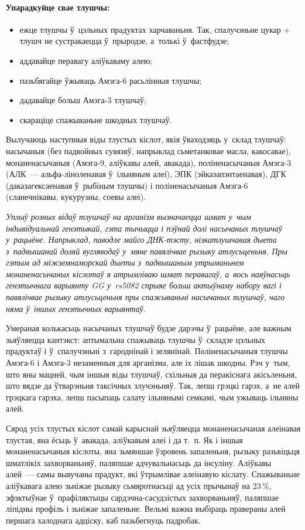 \paragraph{Упарадкуйце свае тлушчы:}
\begin{itemize}
  \item ежце тлушчы ў~цэльных прадуктах харчаваньня. Так, спалучэньне цукар + тлушч не сустракаецца ў~прыродзе, а~толькі ў~фастфудзе;
  \item аддавайце перавагу аліўкаваму алею;
  \item пазьбягайце ўжываць Амэга-6 расьлінныя тлушчы;
  \item дадавайце больш Амэга-3 тлушчаў;
  \item скараціце спажываньне шкодных тлушчаў.
\end{itemize}

Вылучаюць наступныя віды тлустых кіслот, якія ўваходзяць у~склад тлушчаў: насычаныя (без падвойных сувязяў, напрыклад сьметанковае масла, какосавае), монаненасычаныя (Амэга-9, аліўкавы алей, авакада), поліненасычаныя Амэга-3 (АЛК~--- альфа-ліноленавая ў~ільняным алеі), ЭПК (эйказапэнтаенавая), ДГК (даказагексаенавая ў~рыбіным тлушчы) і поліненасычаныя Амэга-6 (сланечнікавы, кукурузны, соевы алеі).

\emph{Уплыў розных відаў тлушчаў на арганізм вызначаецца шмат у~чым індывідуальнай генэтыкай, гэта тычыцца і пэўнай долі насычаных тлушчаў у~рацыёне. Напрыклад, паводле майго ДНК-тэсту, нізкатлушчавая дыета з~падвышанай доляй вугляводаў у~мяне павялічвае рызыку атлусьценьня. Пры гэтым ад міжземнаморскай дыеты з~падвышаным утрыманьнем монаненасычаных кіслотаў я атрымліваю шмат перавагаў, а~вось наяўнасьць генэтычнага варыянту GG у~rs5082 спрыяе больш актыўнаму набору вагі і павялічвае рызыку атлусьценьня пры спажываньні насычаных тлушчаў, чаго няма ў~іншых генэтычных варыянтаў.}

Умераная колькасьць насычаных тлушчаў будзе дарэчы ў~рацыёне, але важным зьяўляецца кантэкст: аптымальна спажываць тлушчы ў~складзе цэльных прадуктаў і ў~спалучэньні з~гароднінай і зелянінай. Поліненасычаныя тлушчы Амэга-6 і Амэга-3 незаменныя для арганізма, але іх лішак шкодны. Рэч у~тым, што яны мацней, чым іншыя віды тлушчаў, схільныя да перакіснага акісьленьня, што вядзе да ўтварэньня таксічных злучэньняў. Так, лепш грэцкі гарэх, а~не алей грэцкага гарэха, лепш пасыпаць салату ільнянымі семкамі, чым ужываць ільняны алей.

Сярод усіх тлустых кіслот самай карыснай зьяўляецца монаненасычаная алеінавая тлустая, яна ёсьць ў~авакада, аліўкавым алеі і да т.~п. Як і іншыя монаненасычаныя кіслоты, яна зьмяншае ўзровень запаленьня, рызыку разьвіцьця шматлікіх захворваньняў, паляпшае адчувальнасьць да інсуліну. Аліўкавы алей~--- самы вывучаны прадукт, які ўтрымлівае алеінавую кіслату. Спажываньне аліўкавага алею зьніжае рызыку сьмяротнасьці ад усіх прычынаў на 23\,\%, эфэктыўнае ў~прафіляктыцы сардэчна-сасудзістых захворваньняў, паляпшае ліпідны профіль і зьніжае запаленьне. Вельмі важна выбіраць правераны алей першага халоднага адціску, каб пазьбегнуць падробак.

